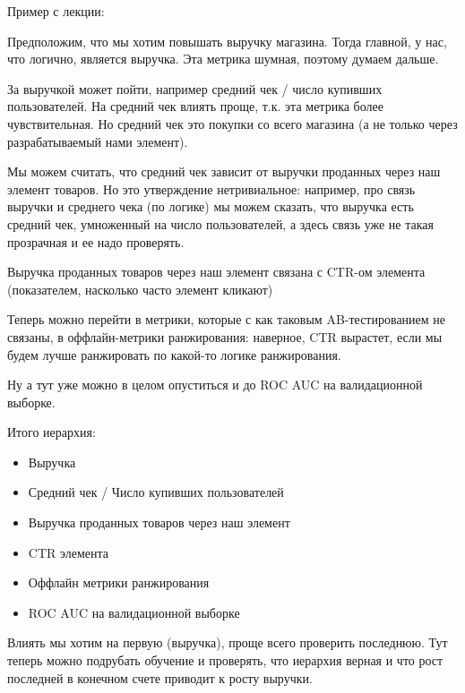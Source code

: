 Пример с лекции:

Предположим, что мы хотим повышать выручку магазина. Тогда главной, у нас, что логично, является выручка. Эта метрика шумная, поэтому думаем дальше. 

За выручкой может пойти, например средний чек / число купивших пользователей. На средний чек влиять проще, т.к. эта метрика более чувствительная. Но средний чек это покупки со всего магазина (а не только через разрабатываемый нами элемент).

Мы можем считать, что средний чек зависит от выручки проданных через наш элемент товаров. Но это утверждение нетривиальное: например, про связь выручки и среднего чека (по логике) мы можем сказать, что выручка есть средний чек, умноженный на число пользователей, а здесь связь уже не такая прозрачная и ее надо проверять.

Выручка проданных товаров через наш элемент связана с CTR-ом элемента (показателем, насколько часто элемент кликают)

Теперь можно перейти в метрики, которые с как таковым AB-тестированием не связаны, в оффлайн-метрики ранжирования: наверное, CTR вырастет, если мы будем лучше ранжировать по какой-то логике ранжирования.

Ну а тут уже можно в целом опуститься и до ROC AUC на валидационной выборке.

Итого иерархия:

\begin{itemize}
	\item Выручка
	
	\item Средний чек / Число купивших пользователей
	
	\item Выручка проданных товаров через наш элемент
	
	\item CTR элемента
	
	\item Оффлайн метрики ранжирования
	
	\item ROC AUC на валидационной выборке
\end{itemize}

Влиять мы хотим на первую (выручка), проще всего проверить последнюю. Тут теперь можно подрубать обучение и проверять, что иерархия верная и что рост последней в конечном счете приводит к росту выручки.